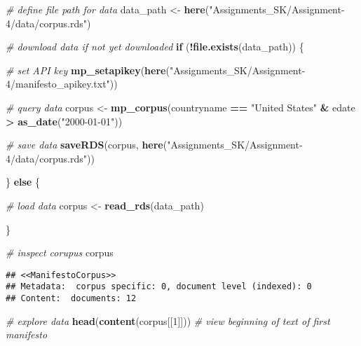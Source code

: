 \documentclass[
]{article}
\newenvironment{Shaded}{\begin{snugshade}}{\end{snugshade}}
\newcommand{\CommentTok}[1]{\textcolor[rgb]{0.56,0.35,0.01}{\textit{#1}}}
\newcommand{\ControlFlowTok}[1]{\textcolor[rgb]{0.13,0.29,0.53}{\textbf{#1}}}
\newcommand{\DecValTok}[1]{\textcolor[rgb]{0.00,0.00,0.81}{#1}}
\newcommand{\FunctionTok}[1]{\textcolor[rgb]{0.13,0.29,0.53}{\textbf{#1}}}
\newcommand{\NormalTok}[1]{#1}
\newcommand{\OtherTok}[1]{\textcolor[rgb]{0.56,0.35,0.01}{#1}}
\newcommand{\SpecialCharTok}[1]{\textcolor[rgb]{0.81,0.36,0.00}{\textbf{#1}}}
\newcommand{\StringTok}[1]{\textcolor[rgb]{0.31,0.60,0.02}{#1}}
\begin{document}
\begin{Shaded}
\begin{Highlighting}[]
\CommentTok{\# define file path for data}
\NormalTok{data\_path }\OtherTok{\textless{}{-}} \FunctionTok{here}\NormalTok{(}\StringTok{"Assignments\_SK/Assignment{-}4/data/corpus.rds"}\NormalTok{) }

\CommentTok{\# download data if not yet downloaded}
\ControlFlowTok{if}\NormalTok{ (}\SpecialCharTok{!}\FunctionTok{file.exists}\NormalTok{(data\_path)) \{}
  
  \CommentTok{\# set API key}
  \FunctionTok{mp\_setapikey}\NormalTok{(}\FunctionTok{here}\NormalTok{(}\StringTok{"Assignments\_SK/Assignment{-}4/manifesto\_apikey.txt"}\NormalTok{))}
  
  \CommentTok{\# query data}
\NormalTok{  corpus }\OtherTok{\textless{}{-}} \FunctionTok{mp\_corpus}\NormalTok{(countryname }\SpecialCharTok{==} \StringTok{"United States"} \SpecialCharTok{\&}\NormalTok{ edate }\SpecialCharTok{\textgreater{}} \FunctionTok{as\_date}\NormalTok{(}\StringTok{"2000{-}01{-}01"}\NormalTok{))}
  
  \CommentTok{\# save data}
  \FunctionTok{saveRDS}\NormalTok{(corpus, }\FunctionTok{here}\NormalTok{(}\StringTok{"Assignments\_SK/Assignment{-}4/data/corpus.rds"}\NormalTok{))}
  
\NormalTok{\} }\ControlFlowTok{else}\NormalTok{ \{}
  
  \CommentTok{\# load data}
\NormalTok{  corpus }\OtherTok{\textless{}{-}} \FunctionTok{read\_rds}\NormalTok{(data\_path)}
  
\NormalTok{\}}

\CommentTok{\# inspect corupus}
\NormalTok{corpus}
\end{Highlighting}
\end{Shaded}

\begin{verbatim}
## <<ManifestoCorpus>>
## Metadata:  corpus specific: 0, document level (indexed): 0
## Content:  documents: 12
\end{verbatim}

\begin{Shaded}
\begin{Highlighting}[]
\CommentTok{\# explore data}
\FunctionTok{head}\NormalTok{(}\FunctionTok{content}\NormalTok{(corpus[[}\DecValTok{1}\NormalTok{]])) }\CommentTok{\# view beginning of text of first manifesto}
\end{Highlighting}
\end{Shaded}
\end{document}
